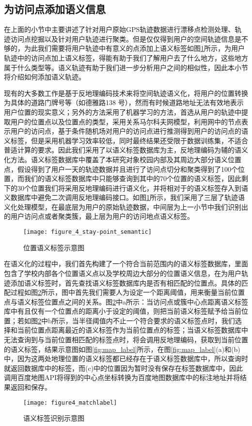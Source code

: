 \subsection{为访问点添加语义信息}
\label{sec:section3-3}
\par 在上面的小节中主要讲述了针对用户原始GPS轨迹数据进行漂移点检测处理、轨迹访问点挖掘以及针对用户轨迹进行聚类。但是仅仅得到用户的空间轨迹信息是不够的，为此我们需要将用户轨迹中有意义的点添加上语义标签如图\ref{fig:tra_senantic}所示，为用户轨迹中的访问点加上语义标签，得能有助于我们了解用户去了什么地方，这些地方属于什么类型等。语义轨迹有助于我们进一步分析用户之间的相似性，因此本小节将介绍如何添加语义轨迹。
\par 现有的大多数工作是基于反地理编码技术来将空间轨迹语义化，将用户的位置转换为具体的道路门牌号等（如德雅路138 号），然而有时候道路地址无法有效地表示用户位置的现实意义；另外的方法采用了机器学习的方法，首选从用户的轨迹中提取用户的位置点以及位置点的类型，采用关系马尔科夫网模型，利用网中的节点表示用户的访问点，基于条件随机场对用户的访问点进行推测得到用户的访问点的语义标签，但是采用机器学习效率较低，同时最终结果还受限于数据训练集，不适合普适计算的要求。因此我们采用了以语义标签数据库为主，反地理编码为辅的语义化方法。语义标签数据库中覆盖了本研究对象校园内部及其周边大部分语义位置点，假设得到了用户一天的轨迹数据并且进行了访问点切分和聚类得到了100个位置，而我们的语义标签数据库中只能够查询到其中的70个位置的语义标签，因此剩下的30个位置我们将采用反地理编码进行语义化，并将相对于的语义标签存入到语义数据库中避免二次调用反地理编码接口。如图\ref{fig:tra_senantic}所示，我们采用了三层了轨迹语义化处理模型，在最底层为用户的原始轨迹数据，中间层为上一小节中我们识别出的用户访问点或者聚类簇，最上层为用户的访问地点语义标签。
\begin{figure}[htp]
\centering
\texttt{[image: figure\_4\_stay-point\_semantic]}
\caption{位置语义标签示意图}
\label{fig:tra_senantic}
\end{figure}
\par 在语义化的过程中，我们首先构建了一个符合当前范围内的语义标签数据库，里面包含了学校内部各个位置语义点以及学校周边大部分的位置语义信息，在为用户轨迹添加语义标签时，首先查找语义标签数据库内是否有相匹配的位置点。具体的匹配过程如图\ref{fig:matchlabel}所示，图中首先我们需要人为设定一个距离阈值，用来衡量当前位置点与语义标签位置点之间的关系。图\ref{fig:matchlabel}中a所示：当访问点或簇中心点距离语义标签库中有且仅有一个位置点的距离小于设定的阈值，则把当前语义标签赋予给当前位置；若如图\ref{fig:matchlabel}中b所示，当半径阈值内不止一个符合要求的语义标签点时，我们选择和当前位置点距离最近的语义标签作为当前位置点的标签；当语义标签数据库中无法查询到与当前位置相匹配的标签点时，将会调用反地理编码，获取到当前位置的语义标签，结果示意图如图\ref{fig:map_label}所示，在图\ref{fig:map_label}(a)和(b)中，因为这两处地理位置的语义标签都已经存在于语义标签数据库中，所以查询时就返回数据库中的标签，而(c)中的位置因为暂时没有保存在标签数据库中，因此调用百度地图API将得到的中心点坐标转换为百度地图数据库中的标注地址并将结果返回和保存。
\begin{figure}[htp]
\centering
\texttt{[image: figure4\_matchlabel]}
\caption{语义标签识别示意图}
\label{fig:matchlabel}
\end{figure}

